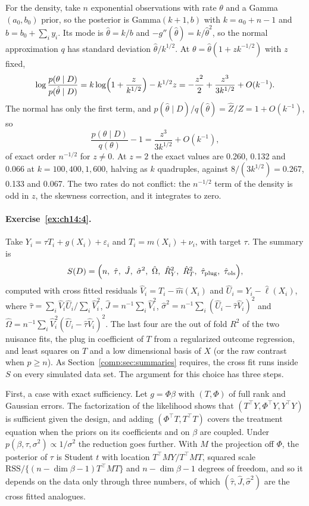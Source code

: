 For the density, take $n$ exponential observations with rate $\theta$ and a Gamma$(a_0, b_0)$ prior, so the posterior is Gamma$(k + 1, b)$ with $k = a_0 + n - 1$ and $b = b_0 + \sum_i y_i$. Its mode is $\hat\theta = k/b$ and $-g''(\hat\theta) = k/\hat\theta^2$, so the normal approximation $q$ has standard deviation $\hat\theta/k^{1/2}$. At $\theta = \hat\theta(1 + zk^{-1/2})$ with $z$ fixed,
\[
\log\frac{p(\theta \mid D)}{p(\hat\theta \mid D)} = k\log\Bigl(1 + \frac{z}{k^{1/2}}\Bigr) - k^{1/2}z = -\frac{z^2}{2} + \frac{z^3}{3k^{1/2}} + O(k^{-1}).
\]
The normal has only the first term, and $p(\hat\theta \mid D)/q(\hat\theta) = \hat Z/Z = 1 + O(k^{-1})$, so
\[
\frac{p(\theta \mid D)}{q(\theta)} - 1 = \frac{z^3}{3k^{1/2}} + O(k^{-1}),
\]
of exact order $n^{-1/2}$ for $z \neq 0$. At $z = 2$ the exact values are 0.260, 0.132 and 0.066 at $k = 100, 400, 1{,}600$, halving as $k$ quadruples, against $8/(3k^{1/2}) = 0.267$, 0.133 and 0.067. The two rates do not conflict: the $n^{-1/2}$ term of the density is odd in $z$, the skewness correction, and it integrates to zero.

\paragraph{Exercise~\ref{ex:ch14:4}.} Take $Y_i = \tau T_i + g(X_i) + \varepsilon_i$ and $T_i = m(X_i) + \nu_i$, with target $\tau$. The summary is
\[
S(D) = \Bigl(n,\ \hat\tau,\ \hat J,\ \hat\sigma^2,\ \hat\Omega,\ \hat R^2_Y,\ \hat R^2_T,\ \hat\tau_{\mathrm{plug}},\ \hat\tau_{\mathrm{ols}}\Bigr),
\]
computed with cross fitted residuals $\hat V_i = T_i - \hat m(X_i)$ and $\hat U_i = Y_i - \hat\ell(X_i)$, where $\hat\tau = \sum_i\hat V_i\hat U_i/\sum_i\hat V_i^2$, $\hat J = n^{-1}\sum_i\hat V_i^2$, $\hat\sigma^2 = n^{-1}\sum_i(\hat U_i - \hat\tau\hat V_i)^2$ and $\hat\Omega = n^{-1}\sum_i\hat V_i^2(\hat U_i - \hat\tau\hat V_i)^2$. The last four are the out of fold $R^2$ of the two nuisance fits, the plug in coefficient of $T$ from a regularized outcome regression, and least squares on $T$ and a low dimensional basis of $X$ (or the raw contrast when $p \geq n$). As Section~\ref{comp:sec:summaries} requires, the cross fit runs inside $S$ on every simulated data set. The argument for this choice has three steps.

First, a case with exact sufficiency. Let $g = \Phi\beta$ with $(T, \Phi)$ of full rank and Gaussian errors. The factorization of the likelihood shows that $(T^\top Y, \Phi^\top Y, Y^\top Y)$ is sufficient given the design, and adding $(\Phi^\top T, T^\top T)$ covers the treatment equation when the priors on its coefficients and on $\beta$ are coupled. Under $p(\beta, \tau, \sigma^2) \propto 1/\sigma^2$ the reduction goes further. With $M$ the projection off $\Phi$, the posterior of $\tau$ is Student $t$ with location $T^\top MY/T^\top MT$, squared scale $\mathrm{RSS}/\{(n - \dim\beta - 1)T^\top MT\}$ and $n - \dim\beta - 1$ degrees of freedom, and so it depends on the data only through three numbers, of which $(\hat\tau, \hat J, \hat\sigma^2)$ are the cross fitted analogues.

